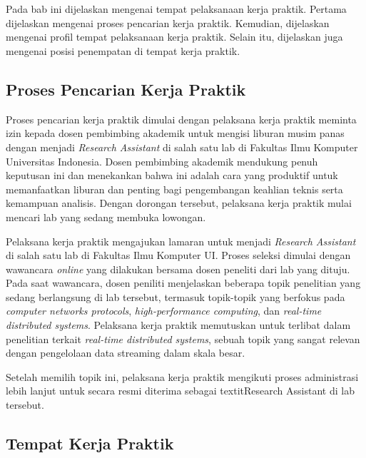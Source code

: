 \chapter{\babSatu}
\label{bab:1}

Pada bab ini dijelaskan mengenai tempat pelaksanaan kerja praktik. Pertama dijelaskan mengenai proses pencarian kerja praktik. Kemudian, dijelaskan mengenai profil tempat pelaksanaan kerja praktik. Selain itu, dijelaskan juga mengenai posisi penempatan di tempat kerja praktik.

\section{Proses Pencarian Kerja Praktik}

Proses pencarian kerja praktik dimulai dengan pelaksana kerja praktik meminta izin kepada dosen pembimbing akademik untuk mengisi liburan musim panas dengan menjadi \textit{Research Assistant} di salah satu lab di Fakultas Ilmu Komputer Universitas Indonesia. Dosen pembimbing akademik mendukung penuh keputusan ini dan menekankan bahwa ini adalah cara yang produktif untuk memanfaatkan liburan dan penting bagi pengembangan keahlian teknis serta kemampuan analisis. Dengan dorongan tersebut, pelaksana kerja praktik mulai mencari lab yang sedang membuka lowongan.

Pelaksana kerja praktik mengajukan lamaran untuk menjadi \textit{Research Assistant} di salah satu lab di Fakultas Ilmu Komputer UI. Proses seleksi dimulai dengan wawancara \textit{online} yang dilakukan bersama dosen peneliti dari lab yang dituju. Pada saat wawancara, dosen peniliti menjelaskan beberapa topik penelitian yang sedang berlangsung di lab tersebut, termasuk topik-topik yang berfokus pada \textit{computer networks protocols}, \textit{high-performance computing}, dan \textit{real-time distributed systems}. Pelaksana kerja praktik memutuskan untuk terlibat dalam penelitian terkait \textit{real-time distributed systems}, sebuah topik yang sangat relevan dengan pengelolaan data streaming dalam skala besar.

Setelah memilih topik ini, pelaksana kerja praktik mengikuti proses administrasi lebih lanjut untuk secara resmi diterima sebagai textit{Research Assistant} di lab tersebut.

\section{Tempat Kerja Praktik}

